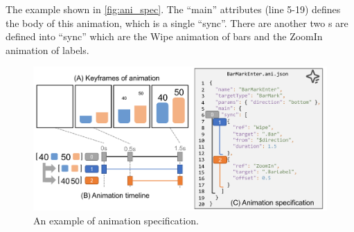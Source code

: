 The example shown in \autoref{fig:ani_spec}. The ``main'' attributes (line 5-19) defines the body of this animation, which is a single \aniunit{} ``sync''. There are another two \aniunit{}s are defined into ``sync'' which are the Wipe animation of bars and the ZoomIn animation of labels.
%

%
\begin{figure}[h]
  \centering
  \includegraphics[width=\linewidth]{figs/ani_spec_ex_in_method.pdf}
  \caption{
  An example of \gaia{} animation specification. }																																																																																																																																																																																																																																																																																														
  \label{fig:ani_spec}
\end{figure}

